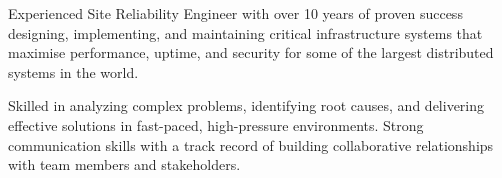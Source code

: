 

\begin{cvparagraph}

Experienced Site Reliability Engineer with over 10 years of proven success designing, implementing, and maintaining critical infrastructure systems that maximise performance, uptime, and security for some of the largest distributed systems in the world.

Skilled in analyzing complex problems, identifying root causes, and delivering effective solutions in fast-paced, high-pressure environments. Strong communication skills with a track record of building collaborative relationships with team members and stakeholders.
\end{cvparagraph}
